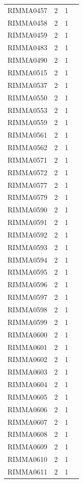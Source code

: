 \documentclass[11pt]{article}
\newcounter{rowno}
\begin{document}
\begin{scriptsize}
\begin{longtable}{>{\stepcounter{rowno}}cccc}
    RIMMA0457 & 2     & 1 \\
    RIMMA0458 & 2     & 1 \\
    RIMMA0459 & 2     & 1 \\
    RIMMA0483 & 2     & 1 \\
    RIMMA0490 & 2     & 1 \\
    RIMMA0515 & 2     & 1 \\
    RIMMA0537 & 2     & 1 \\
    RIMMA0550 & 2     & 1 \\
    RIMMA0553 & 2     & 1 \\
    RIMMA0559 & 2     & 1 \\
    RIMMA0561 & 2     & 1 \\
    RIMMA0562 & 2     & 1 \\
    RIMMA0571 & 2     & 1 \\
    RIMMA0572 & 2     & 1 \\
    RIMMA0577 & 2     & 1 \\
    RIMMA0579 & 2     & 1 \\
    RIMMA0590 & 2     & 1 \\
    RIMMA0591 & 2     & 1 \\
    RIMMA0592 & 2     & 1 \\
    RIMMA0593 & 2     & 1 \\
    RIMMA0594 & 2     & 1 \\
    RIMMA0595 & 2     & 1 \\
    RIMMA0596 & 2     & 1 \\
    RIMMA0597 & 2     & 1 \\
    RIMMA0598 & 2     & 1 \\
    RIMMA0599 & 2     & 1 \\
    RIMMA0600 & 2     & 1 \\
    RIMMA0601 & 2     & 1 \\
    RIMMA0602 & 2     & 1 \\
    RIMMA0603 & 2     & 1 \\
    RIMMA0604 & 2     & 1 \\
    RIMMA0605 & 2     & 1 \\
    RIMMA0606 & 2     & 1 \\
    RIMMA0607 & 2     & 1 \\
    RIMMA0608 & 2     & 1 \\
    RIMMA0609 & 2     & 1 \\
    RIMMA0610 & 2     & 1 \\
    RIMMA0611 & 2     & 1 \\

\end{longtable}
\end{scriptsize}
\end{document}
